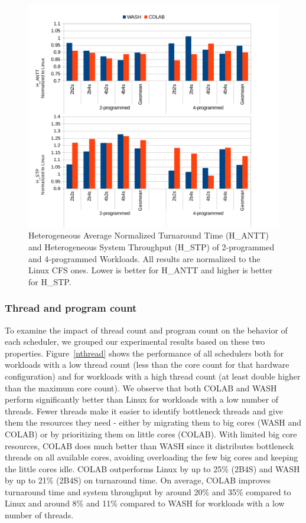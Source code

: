 \begin{figure}
\centering
\includegraphics[scale=0.55]{figures/nprog.pdf}
\caption{Heterogeneous Average Normalized Turnaround Time (H\_ANTT) and Heterogeneous System Throughput (H\_STP) of 2-programmed and 4-programmed Workloads. All results are normalized to the Linux CFS ones. Lower is better for H\_ANTT and higher is better for H\_STP.}
\label{nprog}
\end{figure}

\subsubsection{Thread and program count}
To examine the impact of thread count and program count on the behavior of each scheduler, we grouped our experimental results based on these two properties. Figure~\ref{nthread} shows the performance of all schedulers both for workloads with a low thread count (less than the core count for that hardware configuration) and for workloads with a high thread count (at least double higher than the maximum core count). We observe that both COLAB and WASH perform significantly better than Linux for workloads with a low number of threads. Fewer threads make it easier to identify bottleneck threads and give them the resources they need - either by migrating them to big cores (WASH and COLAB) or by prioritizing them on little cores (COLAB). With limited big core resources, COLAB does much better than WASH since it distributes bottleneck threads on all available cores, avoiding overloading the few big cores and keeping the little cores idle. COLAB outperforms Linux by up to 25\% (2B4S) and WASH by up to 21\% (2B4S) on turnaround time. On average, COLAB improves turnaround time and system throughput by around 20\% and 35\% compared to Linux and around 8\% and 11\% compared to WASH for workloads with a low number of threads.


